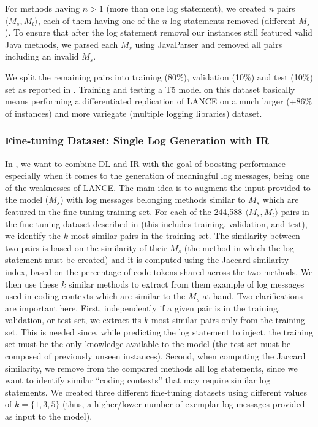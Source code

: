 For methods having $n > 1$ (\ie more than one log statement), we created $n$ pairs $\langle M_s, M_t \rangle$, each of them having one of the $n$ log statements removed (\ie different $M_s$). To ensure that after the log statement removal our instances still featured valid Java methods, we parsed each $M_s$ using JavaParser \cite{javaparser} and removed all pairs including an invalid $M_s$. 

We split the remaining pairs into training (80\%), validation (10\%) and test (10\%) set as reported in . Training and testing a T5 model on this dataset basically means performing a differentiated replication of LANCE on a much larger (+86\% of instances) and more variegate (multiple logging libraries) dataset.

\subsubsection{Fine-tuning Dataset: Single Log Generation with IR} \label{sec:single-log-plus-IR}

In \approach, we want to combine DL and IR with the goal of boosting performance especially when it comes to the generation of meaningful log messages, being one of the weaknesses of LANCE. The main idea is to augment the input provided to the model (\ie $M_{s}$) with log messages belonging methods similar to $M_{s}$ which are featured in the fine-tuning training set. For each of the 244,588 $\langle M_s, M_t \rangle$ pairs in the fine-tuning dataset described in  (this includes training, validation, and test), we identify the $k$ most similar pairs in the training set. The similarity between two pairs is based on the similarity of their $M_s$ (\ie the method in which the log statement must be created) and it is computed using the Jaccard similarity \cite{hancock2004jaccard} index, based on the percentage of code tokens shared across the two methods. We then use these $k$ similar methods to extract from them example of log messages used in coding contexts which are similar to the $M_s$ at hand. Two clarifications are important here. First, independently if a given pair is in the training, validation, or test set, we extract its $k$ most similar pairs only from the training set. This is needed since, while predicting the log statement to inject, the training set must be the only knowledge available to the model (\ie the test set must be composed of previously unseen instances). Second, when computing the Jaccard similarity, we remove from the compared methods all log statements, since we want to identify similar ``coding contexts'' that may require similar log statements. We created three different fine-tuning datasets using different values of $k=\{1,3,5\}$ (thus, a higher/lower number of exemplar log messages provided as input to the model).





